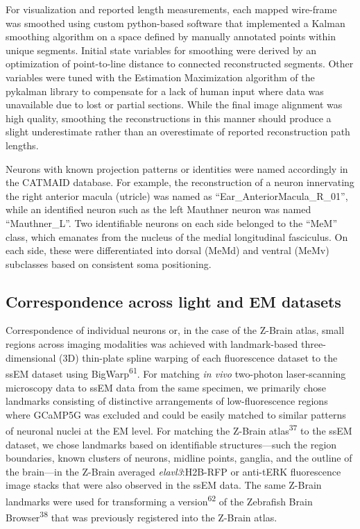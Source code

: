 \documentclass{article}
\begin{document}
For visualization and reported length measurements, each mapped wire-frame was smoothed using custom python-based software that implemented a Kalman smoothing algorithm on a space defined by manually annotated points within unique segments. Initial state variables for smoothing were derived by an optimization of point-to-line distance to connected reconstructed segments. Other variables were tuned with the Estimation Maximization algorithm of the pykalman library to compensate for a lack of human input where data was unavailable due to lost or partial sections. While the final image alignment was high quality, smoothing the reconstructions in this manner should produce a slight underestimate rather than an overestimate of reported reconstruction path lengths.

Neurons with known projection patterns or identities were named accordingly in the CATMAID database. For example, the reconstruction of a neuron innervating the right anterior macula (utricle) was named as “Ear\_AnteriorMacula\_R\_01”, while an identified neuron such as the left Mauthner neuron was named “Mauthner\_L”. Two identifiable neurons on each side belonged to the “MeM” class, which emanates from the nucleus of the medial longitudinal fasciculus. On each side, these were differentiated into dorsal (MeMd) and ventral (MeMv) subclasses based on consistent soma positioning.

\subsection*{Correspondence across light and EM datasets}

Correspondence of individual neurons or, in the case of the Z-Brain atlas, small regions across imaging modalities was achieved with landmark-based three-dimensional (3D) thin-plate spline warping of each fluorescence dataset to the ssEM dataset using BigWarp\textsuperscript{61}. For matching \textit{in vivo} two-photon laser-scanning microscopy data to ssEM data from the same specimen, we primarily chose landmarks consisting of distinctive arrangements of low-fluorescence regions where GCaMP5G was excluded and could be easily matched to similar patterns of neuronal nuclei at the EM level. For matching the Z-Brain atlas\textsuperscript{37} to the ssEM dataset, we chose landmarks based on identifiable structures—such the region boundaries, known clusters of neurons, midline points, ganglia, and the outline of the brain—in the Z-Brain averaged \textit{elavl3}:H2B-RFP or anti-tERK fluorescence image stacks that were also observed in the ssEM data. The same Z-Brain landmarks were used for transforming a version\textsuperscript{62} of the Zebrafish Brain Browser\textsuperscript{38} that was previously registered into the Z-Brain atlas.
\end{document}

